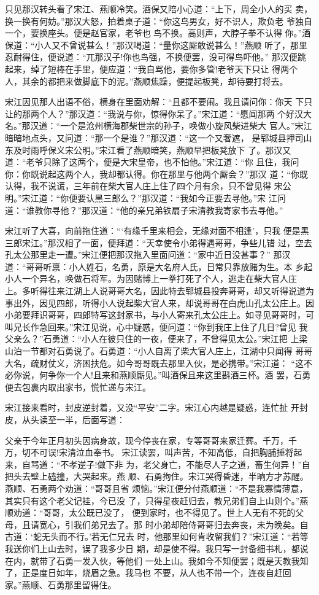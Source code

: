 只见那汉转头看了宋江、燕顺冷笑。酒保又陪小心道：“上下，周全小人的买
卖，换一换有何妨。”那汉大怒，拍着桌子道：“你这鸟男女，好不识人，欺负老
爷独自一个，要换座头。便是赵官家，老爷也鸟不换。高则声，大脖子拳不认得
你。”酒保道：“小人又不曾说甚么！”那汉喝道：“量你这厮敢说甚么！”燕顺
听了，那里忍耐得住，便说道：“兀那汉子!你也鸟强，不换便罢，没可得鸟吓他。”
那汉便跳起来，绰了短棒在手里，便应道：“我自骂他，要你多管!老爷天下只让
得两个人，其余的都把来做脚底下的泥。”燕顺焦躁，便提起板凳，却待要打将去。

宋江因见那人出语不俗，横身在里面劝解：“且都不要闹。我且请问你：你天
下只让的那两个人？”那汉道：“我说与你，惊得你呆了。”宋江道：“愿闻那两
个好汉大名。”那汉道：“一个是沧州横海郡柴世宗的孙子，唤做小旋风柴进柴大
官人。”宋江暗暗地点头，又问道：“那一个是谁？”那汉道：“这一个又奢遮，
是郓城县押司山东及时雨呼保义宋公明。”宋江看了燕顺暗笑，燕顺早把板凳放下
了。那汉又道：“老爷只除了这两个，便是大宋皇帝，也不怕他。”宋江道：“你
且住，我问你：你既说起这两个人，我却都认得。你在那里与他两个厮会？”那汉
道：“你既认得，我不说谎，三年前在柴大官人庄上住了四个月有余，只不曾见得
宋公明。”宋江道：“你便要认黑三郎么？”那汉道：“我如今正要去寻他。”宋
江问道：“谁教你寻他？”那汉道：“他的亲兄弟铁扇子宋清教我寄家书去寻他。”

宋江听了大喜，向前拖住道：“‘有缘千里来相会，无缘对面不相逢’，只我
便是黑三郎宋江。”那汉相了一面，便拜道：“天幸使令小弟得遇哥哥，争些儿错
过，空去孔太公那里走一遭。”宋江便把那汉拖入里面问道：“家中近日没甚事？”
那汉道：“哥哥听禀：小人姓石，名勇，原是大名府人氏，日常只靠放赌为生。本
乡起小人一个异名，唤做石将军。为因赌博上一拳打死了个人，逃走在柴大官人庄
上。多听得往来江湖上人说哥哥大名，因此特去郓城县投奔哥哥，却又听得说道为
事出外，因见四郎，听得小人说起柴大官人来，却说哥哥在白虎山孔太公庄上。因
小弟要拜识哥哥，四郎特写这封家书，与小人寄来孔太公庄上。如寻见哥哥时，可
叫兄长作急回来。”宋江见说，心中疑惑，便问道：“你到我庄上住了几日?曾见
我父亲么？”石勇道：“小人在彼只住的一夜，便来了，不曾得见太公。”宋江把
上梁山泊一节都对石勇说了。石勇道：“小人自离了柴大官人庄上，江湖中只闻得
哥哥大名，疏财仗义，济困扶危。如今哥哥既去那里入伙，是必携带。”宋江道：
“这不必你说，何争你一个人!且来和燕顺厮见。”叫酒保且来这里斟酒三杯。酒
罢，石勇便去包裹内取出家书，慌忙递与宋江。

宋江接来看时，封皮逆封着，又没“平安”二字。宋江心内越是疑惑，连忙扯
开封皮，从头读至一半，后面写道：

父亲于今年正月初头因病身故，现今停丧在家，专等哥哥来家迁葬。千万，千
万，切不可误!宋清泣血奉书。
宋江读罢，叫声苦，不知高低，自把胸脯捶将起来，自骂道：“不孝逆子!做下非
为，老父身亡，不能尽人子之道，畜生何异！”自把头去壁上磕撞，大哭起来。燕
顺、石勇拘住。宋江哭得昏迷，半晌方才苏醒。燕顺、石勇两个劝道：“哥哥且省
烦恼。”宋江便分付燕顺道：“不是我寡情薄意，其实只有这个老父记挂，今已没
了，只得星夜赶归去，教兄弟们自上山则个。”燕顺劝道：“哥哥，太公既已没了，
便到家时，也不得见了。世上人无有不死的父母，且请宽心，引我们弟兄去了。那
时小弟却陪侍哥哥归去奔丧，未为晚矣。自古道：‘蛇无头而不行。’若无仁兄去
时，他那里如何肯收留我们？”宋江道：“若等我送你们上山去时，误了我多少日
期，却是使不得。我只写一封备细书札，都说在内，就带了石勇一发入伙，等他们
一处上山。我如今不知便罢；既是天教我知了，正是度日如年，烧眉之急。我马也
不要，从人也不带一个，连夜自赶回家。”燕顺、石勇那里留得住。

